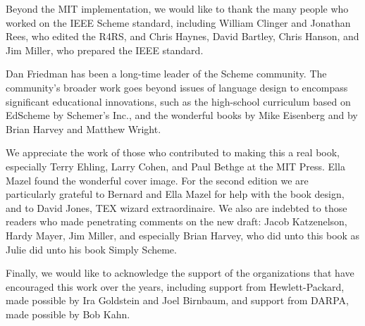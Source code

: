 Beyond the MIT implementation, we would like to thank the many people who worked on the IEEE Scheme standard,
including
William Clinger and Jonathan Rees, who edited the R4RS,
and Chris Haynes, David Bartley, Chris Hanson, and Jim Miller, who prepared the IEEE standard.

Dan Friedman has been a long-time leader of the Scheme community.
The community's broader work goes beyond issues of language design to encompass significant educational innovations,
such as the high-school curriculum based on EdScheme by Schemer's Inc.,
and the wonderful books by Mike Eisenberg and by Brian Harvey and Matthew Wright.

We appreciate the work of those who contributed to making this a real book,
especially
Terry Ehling, Larry Cohen, and Paul Bethge at the MIT Press.
Ella Mazel found the wonderful cover image.
For the second edition we are particularly grateful to
Bernard and Ella Mazel for help with the book design,
and to David Jones, TEX wizard extraordinaire.
We also are indebted to those readers who made penetrating comments on the new draft:
Jacob Katzenelson, Hardy Mayer, Jim Miller,
and especially Brian Harvey, who did unto this book as Julie did unto his book Simply Scheme.

Finally,
we would like to acknowledge the support of the organizations
that have encouraged this work over the years,
including support from
Hewlett-Packard, made possible by Ira Goldstein and Joel Birnbaum,
and support from DARPA, made possible by Bob Kahn.
